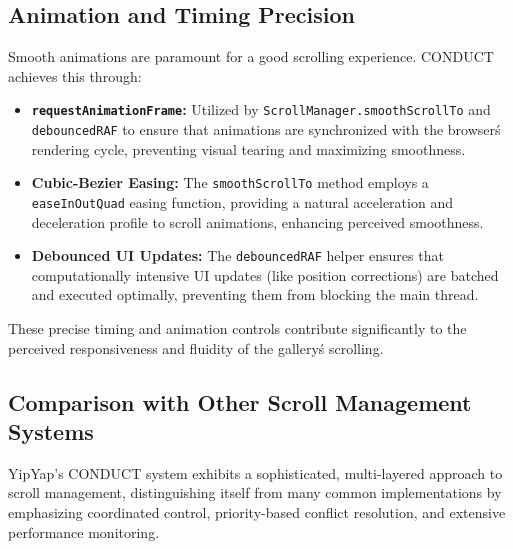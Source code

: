 \documentclass[10pt]{article}
\begin{document}
\subsection{Animation and Timing Precision}

Smooth animations are paramount for a good scrolling experience. CONDUCT achieves this through:
\begin{itemize}
    \item \textbf{\texttt{requestAnimationFrame}:} Utilized by \texttt{ScrollManager.smoothScrollTo} and \texttt{debouncedRAF} to ensure that animations are synchronized with the browser\'s rendering cycle, preventing visual tearing and maximizing smoothness.
    \item \textbf{Cubic-Bezier Easing:} The \texttt{smoothScrollTo} method employs a \texttt{easeInOutQuad} easing function, providing a natural acceleration and deceleration profile to scroll animations, enhancing perceived smoothness.
    \item \textbf{Debounced UI Updates:} The \texttt{debouncedRAF} helper ensures that computationally intensive UI updates (like position corrections) are batched and executed optimally, preventing them from blocking the main thread.
\end{itemize}
These precise timing and animation controls contribute significantly to the perceived responsiveness and fluidity of the gallery\'s scrolling.

\subsection{Comparison with Other Scroll Management Systems}

YipYap's CONDUCT system exhibits a sophisticated, multi-layered approach to scroll management, distinguishing itself from many common implementations by emphasizing coordinated control, priority-based conflict resolution, and extensive performance monitoring.
\end{document}
